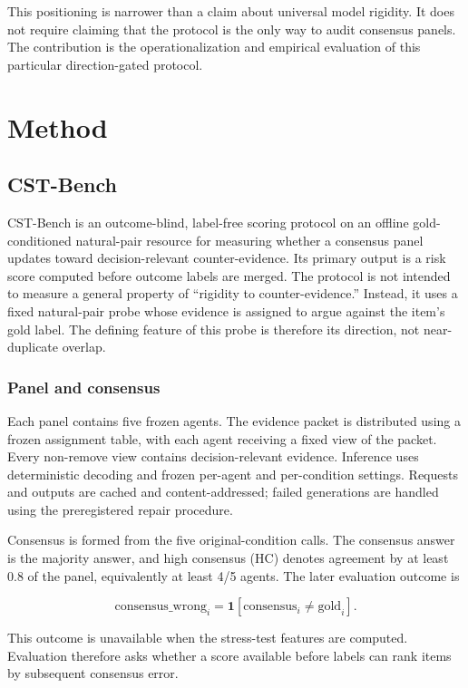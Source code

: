 \documentclass[11pt]{article}
\begin{document}
This positioning is narrower than a claim about universal model rigidity. It does not require claiming that the protocol is the only way to audit consensus panels. The contribution is the operationalization and empirical evaluation of this particular direction-gated protocol.

\section{Method}

\subsection{CST-Bench}

CST-Bench is an outcome-blind, label-free scoring protocol on an offline gold-conditioned natural-pair resource for measuring whether a consensus panel updates toward decision-relevant counter-evidence. Its primary output is a risk score computed before outcome labels are merged. The protocol is not intended to measure a general property of ``rigidity to counter-evidence.'' Instead, it uses a fixed natural-pair probe whose evidence is assigned to argue against the item's gold label. The defining feature of this probe is therefore its direction, not near-duplicate overlap.

\subsubsection{Panel and consensus}

Each panel contains five frozen agents. The evidence packet is distributed using a frozen assignment table, with each agent receiving a fixed view of the packet. Every non-remove view contains decision-relevant evidence. Inference uses deterministic decoding and frozen per-agent and per-condition settings. Requests and outputs are cached and content-addressed; failed generations are handled using the preregistered repair procedure.

Consensus is formed from the five original-condition calls. The consensus answer is the majority answer, and high consensus (HC) denotes agreement by at least 0.8 of the panel, equivalently at least 4/5 agents. The later evaluation outcome is

\[
\mathrm{consensus\_wrong}_i
=
\mathbf{1}
[
\mathrm{consensus}_i
\ne
\mathrm{gold}_i
].
\]

This outcome is unavailable when the stress-test features are computed. Evaluation therefore asks whether a score available before labels can rank items by subsequent consensus error.
\end{document}
